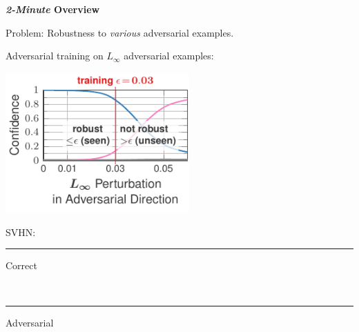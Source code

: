 \documentclass[64pt]{beamer}
\begin{document}
	\begin{frame}[t]{\bfseries \textit{2-Minute} Overview}
		\Large
		
		Problem: Robustness to \emph{various} adversarial examples.
		\vskip 0.25cm
		
		Adversarial training on $L_\infty$ adversarial examples:
		\vskip -0.25cm 
		\begin{minipage}[t]{0.7\textwidth}
			\vspace*{0px}
			\hfill
			\includegraphics[width=7cm]{fig/introduction/advtrain_1_adversarial_unseen}
		\end{minipage}
		\hfill
		\begin{minipage}[t]{0.28\textwidth}
			\vspace*{15px}
			
			\begin{tcolorbox}[
				left=0pt,
				right=0pt,
				top=0pt,
				bottom=0pt,
				colback=gray!12!white,
				colframe=gray!12!white,
				width=1\textwidth, 
				enlarge left by=0mm,
				boxsep=5pt,
				arc=0pt,outer arc=0pt,
				boxrule=1pt,
				]
				\large\color{MPIIblack}
				SVHN:\\
				\textcolor{colorbrewer2}{{\rule[4pt]{10pt}{2pt} Correct}}\\ \textcolor{colorbrewer8}{{\rule[4pt]{10pt}{2pt} Adversarial}}
			\end{tcolorbox}
		\end{minipage}
	\end{frame}
\end{document}
